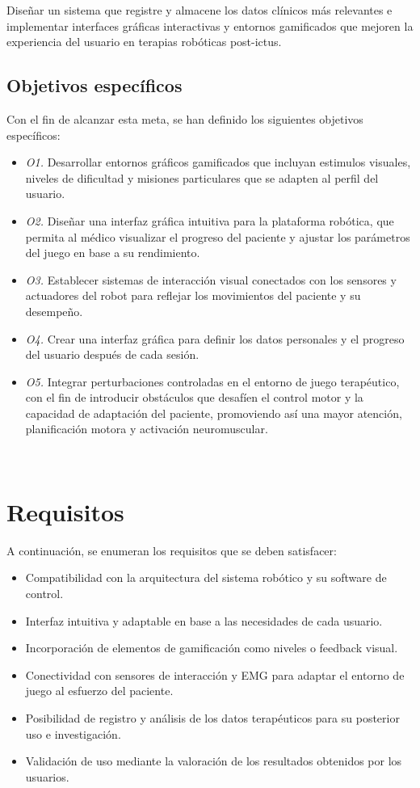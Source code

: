 Diseñar un sistema que registre y almacene los datos clínicos más relevantes e implementar interfaces gráficas interactivas y entornos gamificados que mejoren la experiencia del usuario en terapias robóticas post-ictus.

\subsection{Objetivos específicos}
\label{sec:descripcion}

Con el fin de alcanzar esta meta, se han definido los siguientes objetivos específicos:

\begin{itemize}
    \item \textit{O1.} Desarrollar entornos gráficos gamificados que incluyan estimulos visuales, niveles de dificultad y misiones particulares que se adapten al perfil del usuario.
    \item \textit{O2.} Diseñar una interfaz gráfica intuitiva para la plataforma robótica, que permita al médico visualizar el progreso del paciente y ajustar los parámetros del juego en base a su rendimiento.
    \item \textit{O3.} Establecer sistemas de interacción visual conectados con los sensores y actuadores del robot para reflejar los movimientos del paciente y su desempeño.
    \item \textit{O4.} Crear una interfaz gráfica para definir los datos personales y el progreso del usuario después de cada sesión.
    \item \textit{O5.} Integrar perturbaciones controladas en el entorno de juego terapéutico, con el fin de introducir obstáculos que desafíen el control motor y la capacidad de adaptación del paciente, promoviendo así una mayor atención, planificación motora y activación neuromuscular.
\end{itemize}\

\section{Requisitos}
\label{sec:requisitos}

A continuación, se enumeran los requisitos que se deben satisfacer:

\begin{itemize}
    \item Compatibilidad con la arquitectura del sistema robótico y su software de control.
    \item Interfaz intuitiva y adaptable en base a las necesidades de cada usuario.
    \item Incorporación de elementos de gamificación como niveles o feedback visual.
    \item Conectividad con sensores de interacción y EMG para adaptar el entorno de juego al esfuerzo del paciente.
    \item Posibilidad de registro y análisis de los datos terapéuticos para su posterior uso e investigación.
    \item Validación de uso mediante la valoración de los resultados obtenidos por los usuarios.
\end{itemize}\

